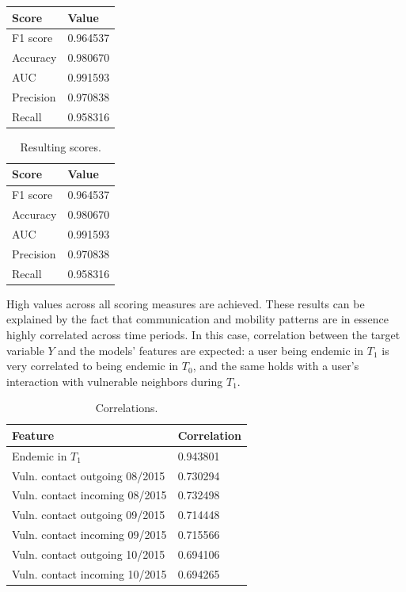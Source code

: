 \begin{center}
\begin{tabular}{ l l }
\toprule
Score & Value \\
\midrule
F1 score  & 0.964537   \\
Accuracy  & 0.980670   \\
AUC       & 0.991593   \\
Precision & 0.970838   \\
Recall    & 0.958316   \\
\bottomrule
\end{tabular}
\end{center}


\begin{table}[ht]
\caption{Resulting scores.}
\label{tab:results}
\centering
\begin{tabular}{ l l }
\toprule
Score & Value \\
\midrule
F1 score  & 0.964537   \\
Accuracy  & 0.980670   \\
AUC       & 0.991593   \\
Precision & 0.970838   \\
Recall    & 0.958316   \\
\bottomrule
\end{tabular}
\end{table}

High values across all scoring measures are achieved. %
These results can be explained by the fact that 
communication and mobility patterns are in essence highly correlated across time periods. 
In this case, correlation between the target variable $Y$ and the models' features are expected:
a user being endemic in $T_1$ is very correlated to being endemic in $T_0$, and the same holds with a user's interaction with vulnerable neighbors during $T_1$.

\begin{table}
\caption{Correlations.}
\label{tab:results}
\centering
\begin{tabular}{l l }
\toprule
Feature & Correlation \\
\midrule
Endemic in $T_1$               & 0.943801 \\
Vuln. contact outgoing 08/2015    & 0.730294 \\ %
Vuln. contact incoming 08/2015     & 0.732498 \\
Vuln. contact outgoing 09/2015    & 0.714448 \\
Vuln. contact incoming 09/2015     & 0.715566 \\ 
Vuln. contact outgoing 10/2015    & 0.694106 \\
Vuln. contact incoming 10/2015     & 0.694265 \\
\bottomrule
\end{tabular}
\end{table}


